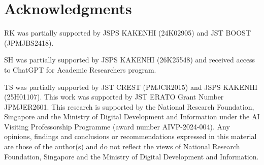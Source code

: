 \section*{Acknowledgments}

RK was partially supported by JSPS KAKENHI (24K02905) and JST BOOST
(JPMJBS2418).

SH was partially supported by JSPS KAKENHI (26K25548) and received access
to ChatGPT for Academic Researchers program.

TS was partially supported by JST CREST (PMJCR2015) and JSPS KAKENHI
(25H01107). This work was supported by JST ERATO Grant Number JPMJER2601.
This research is supported by the National Research Foundation,
Singapore and the Ministry of Digital Development and Information under the
AI Visiting Professorship Programme (award number AIVP-2024-004).
Any opinions, findings and conclusions or recommendations expressed in this
material are those of the author(s) and do not reflect the views of National
Research Foundation, Singapore and the Ministry of Digital Development and
Information.
